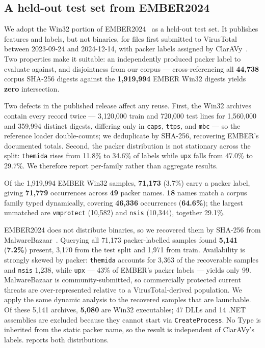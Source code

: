 \subsection{A held-out test set from EMBER2024}

We adopt the Win32 portion of EMBER2024~\cite{ember2024} as a held-out test set.
It publishes features and labels, but not binaries, for files first submitted to
VirusTotal between 2023-09-24 and 2024-12-14, with packer labels assigned by
ClarAVy~\cite{claravy}. Two properties make it suitable: an independently produced
packer label to evaluate against, and disjointness from our corpus ---
cross-referencing all \textbf{44,738} corpus SHA-256 digests against the
\textbf{1,919,994} EMBER Win32 digests yields \textbf{zero} intersection.

Two defects in the published release affect any reuse. First, the Win32 archives
contain every record twice --- 3,120,000 train and 720,000 test lines for
1,560,000 and 359,994 distinct digests, differing only in \texttt{caps},
\texttt{ttps}, and \texttt{mbc} --- so the reference loader double-counts; we
deduplicate by SHA-256, recovering EMBER's documented totals. Second, the packer
distribution is not stationary across the split: \texttt{themida} rises from
11.8\% to 34.6\% of labels while \texttt{upx} falls from 47.0\% to 29.7\%. We
therefore report per-family rather than aggregate results.

Of the 1,919,994 EMBER Win32 samples, \textbf{71,173} (3.7\%) carry a packer
label, giving \textbf{71,779} occurrences across \textbf{49} packer names.
\textbf{18} names match a corpus family typed dynamically, covering
\textbf{46,336} occurrences (\textbf{64.6\%}); the largest unmatched are
\texttt{vmprotect} (10,582) and \texttt{nsis} (10,344), together 29.1\%.

EMBER2024 does not distribute binaries, so we recovered them by SHA-256 from
MalwareBazaar~\cite{malwarebazaar}. Querying all 71,173 packer-labelled samples
found \textbf{5,141} (\textbf{7.2\%}) present, 3,170 from the test split and
1,971 from train. Availability is strongly skewed by packer: \texttt{themida}
accounts for 3,363 of the recoverable samples and \texttt{nsis} 1,238, while
\texttt{upx} --- 43\% of EMBER's packer labels --- yields only 99. MalwareBazaar
is community-submitted, so commercially protected current threats are
over-represented relative to a VirusTotal-derived population. We apply the same
dynamic analysis to the recovered samples that are launchable. Of these 5,141
archives, \textbf{5,080} are Win32 executables; 47 DLLs and 14 .NET
assemblies are excluded because they cannot start via \texttt{CreateProcess}. No
Type is inherited from the static packer name, so the result is independent of
ClarAVy's labels.  reports both distributions.

